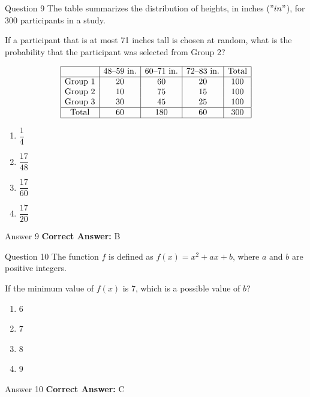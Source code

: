 \documentclass{beamer}
\begin{document}
\begin{frame}{Question 9}
\small
The table summarizes the distribution of heights, in inches (\("in"\)), for 300 participants in a study.

If a participant that is at most 71 inches tall is chosen at random, what is the probability that the participant was selected from Group 2?

\[
\begin{array}{|c|c|c|c|c|}
\hline
 & \text{48--59 in.} & \text{60--71 in.} & \text{72--83 in.} & \text{Total} \\
\hline
\text{Group 1} & 20 & 60 & 20 & 100 \\
\text{Group 2} & 10 & 75 & 15 & 100 \\
\text{Group 3} & 30 & 45 & 25 & 100 \\
\hline
\text{Total} & 60 & 180 & 60 & 300 \\
\hline
\end{array}
\]
\vspace{0.35cm}
\begin{enumerate}
    \item[A.] \(\dfrac{1}{4}\)
    \item[B.] \(\dfrac{17}{48}\)
    \item[C.] \(\dfrac{17}{60}\)
    \item[D.] \(\dfrac{17}{20}\)
\end{enumerate}
\end{frame}
\begin{frame}{Answer 9}
\small
\textbf{Correct Answer:} B
\end{frame}

\begin{frame}{Question 10}
\small
The function \(f\) is defined as \(f(x) = x^2 + ax + b\), where \(a\) and \(b\) are positive integers.

If the minimum value of \(f(x)\) is 7, which is a possible value of \(b\)?
\vspace{0.35cm}
\begin{enumerate}
    \item[A.] 6
    \item[B.] 7
    \item[C.] 8
    \item[D.] 9
\end{enumerate}
\end{frame}
\begin{frame}{Answer 10}
\small
\textbf{Correct Answer:} C
\end{frame}
\end{document}
